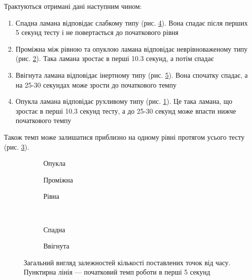 Трактуються отримані дані наступним чином:
\begin{enumerate}
  \item Спадна ламана відповідає слабкому типу (рис. \ref{fig:tapping:weak}).
    Вона спадає після перших 5 секунд тесту і не повертається до початкового
    рівня
  \item Проміжна між рівною та опуклою ламана відповідає неврівноваженому типу
    (рис. \ref{fig:tapping:middle}).
    Така ламана зростає в перші 10.3 секунд, а потім спадає
  \item Ввігнута ламана відповідає інертному типу
    (рис. \ref{fig:tapping:concave}).
    Вона спочатку спадає, а на 25-30 секундах може зрости до початкового темпу
  \item Опукла ламана відповідає рухливому типу
    (рис. \ref{fig:tapping:movable}).
    Це така ламана, що зростає в перші 10.3 секунд тесту, а до 25-30 секунд
    може впасти нижче початкового темпу
\end{enumerate}
Також темп може залишатися приблизно на одному рівні протягом усього тесту
(рис. \ref{fig:tapping:flat}).

\begin{figure}[h]
  \centering
  \begin{subfigure}[b]{0.3\textwidth}
                \caption{Опукла}
                \label{fig:tapping:movable}
  \end{subfigure}
  \begin{subfigure}[b]{0.3\textwidth}
                \caption{Проміжна}
                \label{fig:tapping:middle}
  \end{subfigure}
  \begin{subfigure}[b]{0.3\textwidth}
                \caption{Рівна}
                \label{fig:tapping:flat}
  \end{subfigure}\\[2ex]
  \begin{subfigure}[b]{0.3\textwidth}
                \caption{Спадна}
                \label{fig:tapping:weak}
  \end{subfigure}
  \begin{subfigure}[b]{0.3\textwidth}
                \caption{Ввігнута}
                \label{fig:tapping:concave}
  \end{subfigure}
  \caption{Загальний вигляд залежностей кількості поставлених точок від часу.
  Пунктирна лінія --- початковий темп роботи в перші 5 секунд}
  \label{fig:tikz:studentBehaviorSimple}
\end{figure}
